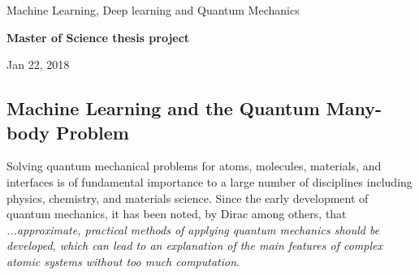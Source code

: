 \documentclass[%
oneside,                 %
final,                   %
10pt]{article}
\begin{document}

\newcommand{\exercisesection}[1]{\subsection*{#1}}






\thispagestyle{empty}

\begin{center}
{\LARGE\bf
\begin{spacing}{1.25}
Machine Learning, Deep learning and Quantum Mechanics
\end{spacing}
}
\end{center}


\begin{center}
{\bf Master of Science thesis project${}^{}$} \\ [0mm]
\end{center}

\begin{center}
\end{center}
    

\begin{center}
Jan 22, 2018
\end{center}

\vspace{1cm}


\subsection{Machine Learning and the Quantum Many-body Problem}

Solving quantum mechanical problems for atoms,  molecules, materials, and
interfaces is of fundamental importance to a large number of
disciplines including physics, chemistry, and materials science. Since
the early development of quantum mechanics, it has been noted, by
Dirac among others, that \emph{...approximate, practical methods of applying quantum mechanics should be developed, which can lead to an explanation of the main features of complex atomic systems without too much computation}. 
\end{document}
